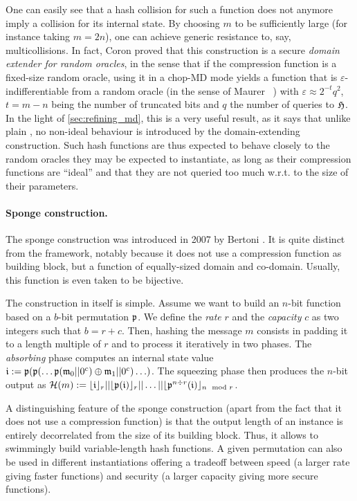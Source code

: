 One can easily see that a hash collision for such a function does not anymore imply a collision for its internal state. By choosing $m$ to be sufficiently large (for instance taking $m = 2n$),
one can achieve generic resistance to, say, multicollisions. In fact, Coron \etal proved that this construction is a secure \emph{domain extender for random oracles}, in the sense that
if the compression function is a fixed-size random oracle, using it in a chop-MD mode yields a function that is $\varepsilon$-indifferentiable from a random oracle (in the sense of Maurer \etal~\cite{DBLP:conf/tcc/MaurerRH04})
with $\varepsilon \approx 2^{-t}q^2$, $t = m - n$ being the number of truncated bits and $q$ the number of queries to $\operatorname{\mathfrak{H}}$. In the light of \autoref{sec:refining_md}, this is a very useful result, as it
says that unlike plain \merkdam, no non-ideal behaviour is introduced by the domain-extending construction. Such hash functions are thus expected to behave closely to the random oracles they may be expected to instantiate, as long as
their compression functions are ``ideal'' and that they are not queried too much w.r.t. to the size of their parameters.

\paragraph{Sponge construction.} The sponge construction was introduced in 2007 by Bertoni \etal \cite{SpongeFunctions}. It is quite distinct from the \merkdam framework, notably because it does not use a compression
function as building block, but a function of equally-sized domain and co-domain. Usually, this function is even taken to be bijective.

The construction in itself is simple. Assume we want to build an $n$-bit function based on a $b$-bit permutation $\operatorname{\mathfrak{p}}$. We define the \emph{rate} $r$ and the \emph{capacity} $c$ as two integers such that
$b = r + c$. Then, hashing the message $m$ consists in padding it to a length multiple of $r$ and to process it iteratively
in two phases. The \emph{absorbing} phase computes an internal state value $\mathfrak{i} := \operatorname{\mathfrak{p}}(\operatorname{\mathfrak{p}}(\ldots\operatorname{\mathfrak{p}}(\mathfrak{m}_0||0^c)\oplus\mathfrak{m}_1||0^c)\ldots)$. The squeezing phase then produces the
$n$-bit output as $\operatorname{\mathcal{H}}(m) := \lfloor\mathfrak{i}\rfloor_r||\lfloor\operatorname{\mathfrak{p}}(\mathfrak{i})\rfloor_r||\ldots||\lfloor\operatorname{\mathfrak{p}}^{n \div r}(\mathfrak{i})\rfloor_{n \mod r}$.

A distinguishing feature of the sponge construction (apart from the fact that it does not use a compression function) is that the output length of an instance is entirely decorrelated from the size of its building
block. Thus, it allows to swimmingly build variable-length hash functions. A given permutation can also be used in different instantiations offering a tradeoff between speed (a larger rate giving
faster functions) and security (a larger capacity giving more secure functions).

